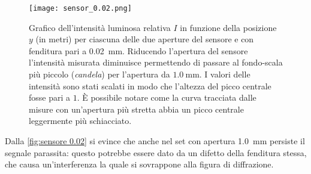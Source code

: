 \documentclass[../main.tex]{subfiles}
\begin{document}
\begin{figure}[ht!]
    \centering
    \texttt{[image: sensor\_0.02.png]}
    \caption{Grafico dell'intensità luminosa relativa $I$ in funzione della posizione $y$ (in metri) per ciascuna delle due aperture del sensore e con fenditura pari a \qty{0.02}{\mm}.
        Riducendo l'apertura del sensore l'intensità misurata diminuisce permettendo di passare al fondo-scala più piccolo (\textit{candela}) per l'apertura da $\qty{1.0}{\mm}$.
        I valori delle intensità sono stati scalati in modo che l'altezza del picco centrale fosse pari a $1$. È possibile notare come la curva tracciata dalle misure con un'apertura più stretta abbia un picco centrale leggermente più schiacciato.
        }
    \label{fig:sensore 0.02}
\end{figure}

Dalla \autoref{fig:sensore 0.02} si evince che anche nel set con apertura \qty{1.0}{\mm} persiste il segnale parassita: questo potrebbe essere dato da un difetto della fenditura stessa, che causa un'interferenza la quale si sovrappone alla figura di diffrazione.
\end{document}
